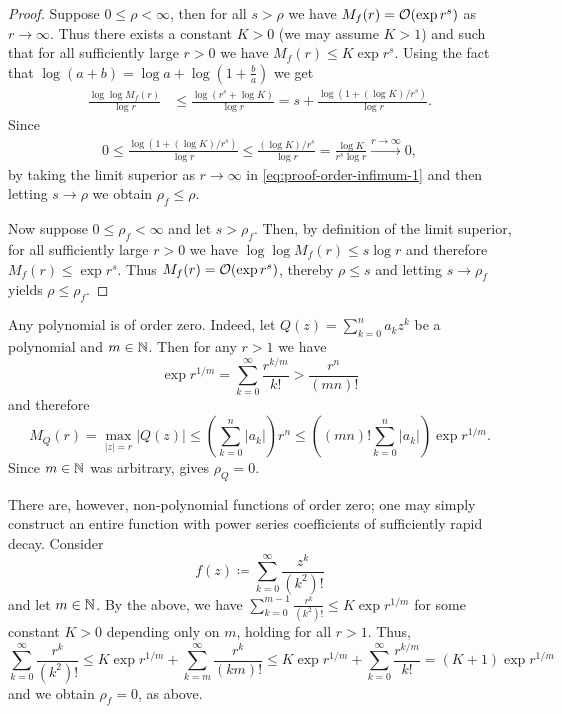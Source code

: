 \begin{proof}
    Suppose $0 \leq \rho < \infty$, then for all $s > \rho$ we have $M_f(r) = \mathcal{O}(\exp r^s)$ as $r \to \infty$. Thus there exists a constant $K > 0$ (we may assume $K > 1$) and such that for all sufficiently large $r > 0$ we have $M_f(r) \leq K \exp r^s$. Using the fact that $\log (a+b) = \log a + \log (1 + \frac{b}{a})$ we get
    \begin{align*}
        \frac{\log \log M_f(r)}{\log r} &\leq \frac{\log (r^s + \log K)}{\log r} = s + \frac{\log (1 + (\log K) / r^s)}{\log r}. \tag{\textasteriskcentered} \label{eq:proof-order-infimum-1}
    \end{align*}
    Since
    \begin{align*}
        0 \leq \frac{\log (1 + (\log K) / r^s)}{\log r} \leq \frac{(\log K) / r^s}{\log r} = \frac{\log K}{r^s \log r} \xrightarrow{r \to \infty} 0,
    \end{align*}
    by taking the limit superior as $r \to \infty$ in \eqref{eq:proof-order-infimum-1} and then letting $s \to \rho$ we obtain $\rho_f \leq \rho$.

    Now suppose $0 \leq \rho_f < \infty$ and let $s > \rho_f$. Then, by definition of the limit superior, for all sufficiently large $r > 0$ we have $ \log \log M_f(r) \leq s \log r$ and therefore $M_f(r) \leq \exp r^s$. Thus $M_f(r) = \mathcal{O}(\exp r^s)$, thereby $\rho \leq s$ and letting $s \to \rho_f$ yields $\rho \leq \rho_f$.
\end{proof}

\begin{remark} \label{rem:order-zero}
    Any polynomial is of order zero. Indeed, let $Q(z) = \sum_{k=0}^n a_k z^k$ be a polynomial and $m \in \mathbb{N}$. Then for any $r > 1$ we have
    $$ \exp r^{1/m} = \sum_{k=0}^\infty \frac{r^{k/m}}{k!} > \frac{r^{n}}{(mn)!} $$
    and therefore
    $$ M_Q(r) = \max_{\vert z \vert = r} \vert Q(z) \vert \leq \left( \sum_{k=0}^n \vert a_k \vert \right) r^n \leq \left( (mn)! \sum_{k=0}^n \vert a_k \vert \right) \exp r^{1/m}. $$
    Since $m \in \mathbb{N}$ was arbitrary,  gives $\rho_Q = 0$.

    There are, however, non-polynomial functions of order zero; one may simply construct an entire function with power series coefficients of sufficiently rapid decay. Consider
    $$ f(z) \coloneqq \sum_{k=0}^\infty \frac{z^k}{(k^2)!} $$
    and let $m \in \mathbb{N}$. By the above, we have $\sum_{k=0}^{m-1} \frac{r^k}{(k^2)!} \leq K \exp r^{1/m}$ for some constant $K > 0$ depending only on $m$, holding for all $r > 1$. Thus,
    $$ \sum_{k=0}^\infty \frac{r^k}{(k^2)!} \leq K \exp r^{1/m} + \sum_{k=m}^\infty \frac{r^k}{(km)!} \leq K \exp r^{1/m} + \sum_{k=0}^\infty \frac{r^{k/m}}{k!} = (K + 1) \exp r^{1/m} $$
    and we obtain $\rho_f = 0$, as above.
\end{remark}

